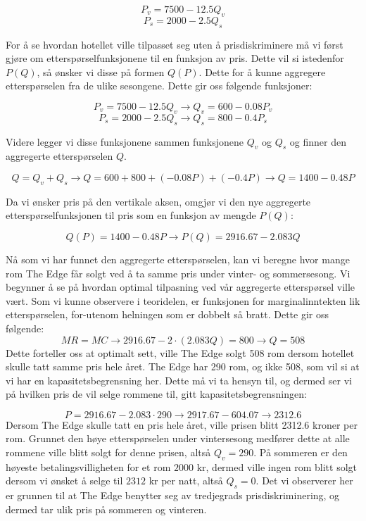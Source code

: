 \documentclass[
  12pt,
  a4paper,
  DIV=11,
  numbers=noendperiod]{scrartcl}
\begin{document}
\[P_v = 7500 - 12.5Q_v\] \[P_s = 2000 - 2.5Q_s\]

For å se hvordan hotellet ville tilpasset seg uten å prisdiskriminere må
vi først gjøre om etterspørselfunksjonene til en funksjon av pris. Dette
vil si istedenfor \(P(Q)\), så ønsker vi disse på formen \(Q(P)\). Dette
for å kunne aggregere etterspørselen fra de ulike sesongene. Dette gir
oss følgende funksjoner:

\[P_v = 7500 - 12.5Q_v \rightarrow Q_v = 600 - 0.08P_v\]
\[P_s = 2000 - 2.5Q_s \rightarrow Q_s = 800 - 0.4P_s\]

Videre legger vi disse funksjonene sammen funksjonene \(Q_v\) og \(Q_s\)
og finner den aggregerte etterspørselen \(Q\).

\[
Q = Q_v + Q_s \rightarrow Q = 600 + 800 + (- 0.08P) + (- 0.4P) \rightarrow Q = 1400 - 0.48P
\]

Da vi ønsker pris på den vertikale aksen, omgjør vi den nye aggregerte
etterspørselfunksjonen til pris som en funksjon av mengde \(P(Q)\):

\[
Q(P) = 1400 - 0.48P \rightarrow P(Q) = 2916.67 - 2.083Q
\]

Nå som vi har funnet den aggregerte etterspørselen, kan vi beregne hvor
mange rom The Edge får solgt ved å ta samme pris under vinter- og
sommersesong. Vi begynner å se på hvordan optimal tilpasning ved vår
aggregerte etterspørsel ville vært. Som vi kunne observere i teoridelen,
er funksjonen for marginalinntekten lik etterspørselen, for-utenom
helningen som er dobbelt så bratt. Dette gir oss følgende:
\[MR = MC \rightarrow 2916.67 - 2 \cdot (2.083Q) = 800 \rightarrow Q = 508\]Dette
forteller oss at optimalt sett, ville The Edge solgt 508 rom dersom
hotellet skulle tatt samme pris hele året. The Edge har 290 rom, og ikke
508, som vil si at vi har en kapasitetsbegrensning her. Dette må vi ta
hensyn til, og dermed ser vi på hvilken pris de vil selge rommene til,
gitt kapasitetsbegrensningen:

\[P = 2916.67 - 2.083 \cdot 290 \rightarrow 2917.67 - 604.07 \rightarrow 2312.6\]Dersom
The Edge skulle tatt en pris hele året, ville prisen blitt 2312.6 kroner
per rom. Grunnet den høye etterspørselen under vintersesong medfører
dette at alle rommene ville blitt solgt for denne prisen, altså
\(Q_v=290\). På sommeren er den høyeste betalingsvilligheten for et rom
\(2000\) kr, dermed ville ingen rom blitt solgt dersom vi ønsket å selge
til \(2312\) kr per natt, altså \(Q_s = 0\). Det vi observerer her er
grunnen til at The Edge benytter seg av tredjegrads prisdiskriminering,
og dermed tar ulik pris på sommeren og vinteren.
\end{document}
